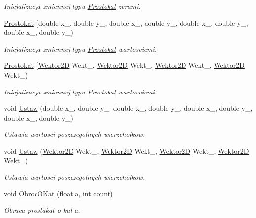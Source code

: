 \begin{DoxyCompactItemize}
\begin{DoxyCompactList}\small\item\em Inicjalizacja zmiennej typu \hyperlink{class_prostokat}{Prostokat} zerami. \end{DoxyCompactList}\item 
\hyperlink{class_prostokat_aa6317fe9a126316a5ef4f56f7a11cfe6}{Prostokat} (double x\+\_, double y\+\_, double x\+\_, double y\+\_, double x\+\_, double y\+\_, double x\+\_, double y\+\_)
\begin{DoxyCompactList}\small\item\em Inicjalizacja zmiennej typu \hyperlink{class_prostokat}{Prostokat} wartosciami. \end{DoxyCompactList}\item 
\hyperlink{class_prostokat_abcdb414ae6950559026743bb8b984a9d}{Prostokat} (\hyperlink{class_wektor2_d}{Wektor2\+D} Wekt\+\_, \hyperlink{class_wektor2_d}{Wektor2\+D} Wekt\+\_, \hyperlink{class_wektor2_d}{Wektor2\+D} Wekt\+\_, \hyperlink{class_wektor2_d}{Wektor2\+D} Wekt\+\_)
\begin{DoxyCompactList}\small\item\em Inicjalizacja zmiennej typu \hyperlink{class_prostokat}{Prostokat} wartosciami. \end{DoxyCompactList}\item 
void \hyperlink{class_prostokat_ac07b58a6344f7b9aa8c329e57bb9793d}{Ustaw} (double x\+\_, double y\+\_, double x\+\_, double y\+\_, double x\+\_, double y\+\_, double x\+\_, double y\+\_)
\begin{DoxyCompactList}\small\item\em Ustawia wartosci poszczegolnych wierzcholkow. \end{DoxyCompactList}\item 
void \hyperlink{class_prostokat_ae9dde4a8d1e10335f506154800712235}{Ustaw} (\hyperlink{class_wektor2_d}{Wektor2\+D} Wekt\+\_, \hyperlink{class_wektor2_d}{Wektor2\+D} Wekt\+\_, \hyperlink{class_wektor2_d}{Wektor2\+D} Wekt\+\_, \hyperlink{class_wektor2_d}{Wektor2\+D} Wekt\+\_)
\begin{DoxyCompactList}\small\item\em Ustawia wartosci poszczegolnych wierzcholkow. \end{DoxyCompactList}\item 
void \hyperlink{class_prostokat_a6407ea37b4c49d7ec47d0d9681834133}{Obroc\+O\+Kat} (float a, int count)
\begin{DoxyCompactList}\small\item\em Obraca prostakat o kat a. \end{DoxyCompactList}\item 

\end{DoxyCompactItemize}
